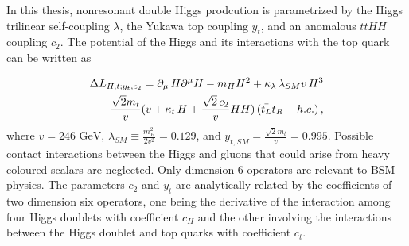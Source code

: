 In this thesis, nonresonant double Higgs prodcution is parametrized by the Higgs trilinear
self-coupling $\lambda$, the Yukawa top coupling $y_t$, and an anomalous $t\bar{t}HH$ coupling $c_2$.
The potential of the Higgs and its interactions with the top quark can be written as

\begin{equation}
\begin{split}
\Delta L_{H,t;y_t,c_2}= 
\partial_{\mu}\, H \partial^{\mu} H - m_H H^2 +
\kappa_{\lambda}\, \lambda_{SM} v\, H^3 \\
- \frac{\sqrt{2} m_t}{v}(v+  \kappa_{t}\,   H  +  \frac{ \sqrt{2}\, c_2}{v} H  H ) \,( \bar{t_L}t_R + h.c.)  \,,
\end{split}
\label{eq:Hpot}
\end{equation}
where $v = 246 \mbox{ GeV}$, $\lambda_{SM} \equiv \frac{m_H^2}{2 v^2} = 0.129$, and
$y_{t,SM} = \frac{\sqrt{2} m_t}{v} = 0.995$. Possible contact interactions between the
Higgs and gluons that could arise from heavy coloured scalars are neglected.
Only dimension-6 operators are relevant to BSM physics. The parameters $c_2$ and $y_t$ are
analytically related by the coefficients of two dimension six operators, one being the
derivative of the interaction among four Higgs doublets with coefficient $c_H$
and the other involving the interactions between the Higgs doublet and top quarks
with coefficient $c_t$.

